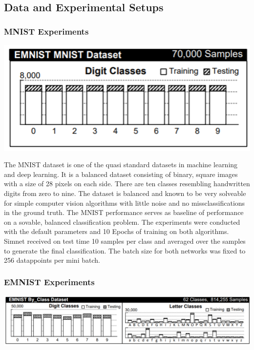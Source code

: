 \documentclass[a4paper,pt12]{article}
\begin{document}
\subsection{Data and Experimental Setups}

\subsubsection{MNIST Experiments}

\includegraphics[scale=0.8]{mnist.png}

The MNIST dataset is one of the quasi standard datasets in machine learning and deep learning. It is a balanced dataset consisting of binary, square images with a size of 28 pixels on each side. There are ten classes resembling handwritten digits from zero to nine. The dataset is balanced and known to be very solveable for simple computer vision algorithms with little noise and no missclassifications in the ground truth. \newline
The MNIST performance serves as baseline of performance on a sovable, balanced classification problem. \newline
The experiments were conducted with the default parameters and 10 Epochs of training on both algorithms. Simnet received on test time 10 samples per class and averaged over the samples to generate the final classification. The batch size for both networks was fixed to 256 datappoints per mini batch.

\subsubsection{EMNIST Experiments}

\includegraphics[scale=0.6]{emnist.png}
\end{document}
